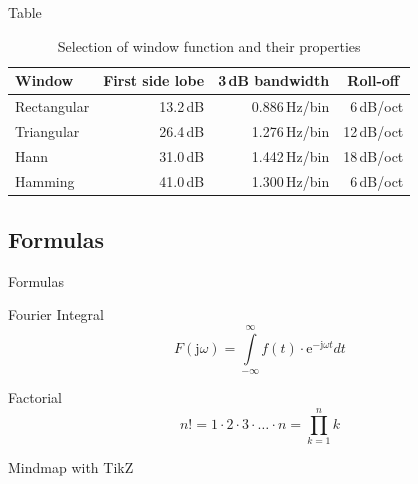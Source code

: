 \documentclass[xcolor={svgnames},12pt,aspectratio=169,handout]{beamer}
\begin{document}
\begin{frame}{Table}
    \begin{table}[]
        \caption{Selection of window function and their properties}
        \begin{tabular}[]{lrrr}
            \toprule
            \textbf{Window}	& \multicolumn{1}{c}{\textbf{First side lobe}}
            & \multicolumn{1}{c}{\textbf{3\,dB bandwidth}}
            & \multicolumn{1}{c}{\textbf{Roll-off}} \\
            \midrule
            Rectangular				& 13.2\,dB	& 0.886\,Hz/bin	& 6\,dB/oct		\\[0.25em]
            Triangular				& 26.4\,dB	& 1.276\,Hz/bin	& 12\,dB/oct	\\[0.25em]
            Hann					& 31.0\,dB	& 1.442\,Hz/bin	& 18\,dB/oct	\\[0.25em]
            Hamming					& 41.0\,dB	& 1.300\,Hz/bin	& 6\,dB/oct		\\
            \bottomrule
        \end{tabular}
        \label{tab:WindowFunctions}
    \end{table}
\end{frame}

\subsection{Formulas}

\begin{frame}{Formulas}
    \begin{block}{Fourier Integral}
        \begin{equation*}
            F(\textrm{j}\omega) = \int\limits_{-\infty}^{\infty} f(t)\cdot\textrm{e}^{-\textrm{j}\omega t} dt
        \end{equation*}
    \end{block}

    \begin{block}{Factorial}
        \begin{equation*}
            n! = 1\cdot 2 \cdot 3 \cdot\ldots\cdot n = \prod_{k=1}^n k
        \end{equation*}
    \end{block}
\end{frame}

\begin{frame}{Mindmap with TikZ}
    \centering
\end{frame}
\end{document}

